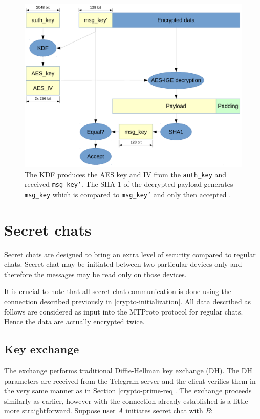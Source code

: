 \documentclass[thesis=M,english]{FITthesis}[2012/10/20]
\begin{document}
\begin{figure}[htb]
	\centering
	\includegraphics[width=1\textwidth]{mtproto-decflow.pdf}
	\caption{The KDF produces the AES key and IV from the \texttt{auth\_key} and received \texttt{msg\_key'}. The SHA-1 of the decrypted payload generates \texttt{msg\_key} which is compared to \texttt{msg\_key'} and only then accepted \cite{telegram-aarhus}.}
	\label{img:telegram-decflow}
\end{figure}




\section{Secret chats}\label{crypto-secret}

Secret chats are designed to bring an extra level of security compared to regular chats. Secret chat may be initiated between two particular devices only and therefore the messages may be read only on those devices.

It is crucial to note that all secret chat communication is done using the connection described previously in \ref{crypto-initialization}. All data described as follows are considered as input into the MTProto protocol for regular chats. Hence the data are actually encrypted twice.%

\subsection{Key exchange}\label{crypto-keyexchange}

The exchange performs traditional Diffie-Hellman key exchange (DH). The DH parameters are received from the Telegram server and the client verifies them in the very same manner as in Section \ref{crypto-prime-req}. The exchange proceeds similarly as earlier, however with the connection already established is a little more straightforward. Suppose user $A$ initiates secret chat with $B$:
\end{document}
